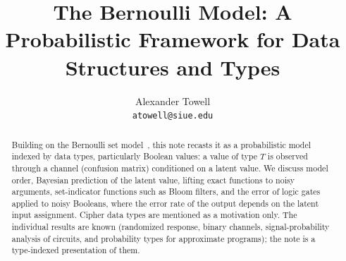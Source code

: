 \documentclass[11pt,a4paper]{article}
\title{The Bernoulli Model: A Probabilistic Framework for Data Structures and Types}
\author{Alexander Towell\\\texttt{atowell@siue.edu}}
\date{}
\begin{document}
\maketitle

\begin{abstract}
Building on the Bernoulli set model~\cite{bernoulliSets}, this note recasts it as a probabilistic model indexed by data types, particularly Boolean values: a value of type $T$ is observed through a channel (confusion matrix) conditioned on a latent value. We discuss model order, Bayesian prediction of the latent value, lifting exact functions to noisy arguments, set-indicator functions such as Bloom filters, and the error of logic gates applied to noisy Booleans, where the error rate of the output depends on the latent input assignment. Cipher data types are mentioned as a motivation only. The individual results are known (randomized response, binary channels, signal-probability analysis of circuits, and probability types for approximate programs); the note is a type-indexed presentation of them.
\end{abstract}



\tableofcontents











\end{document}
